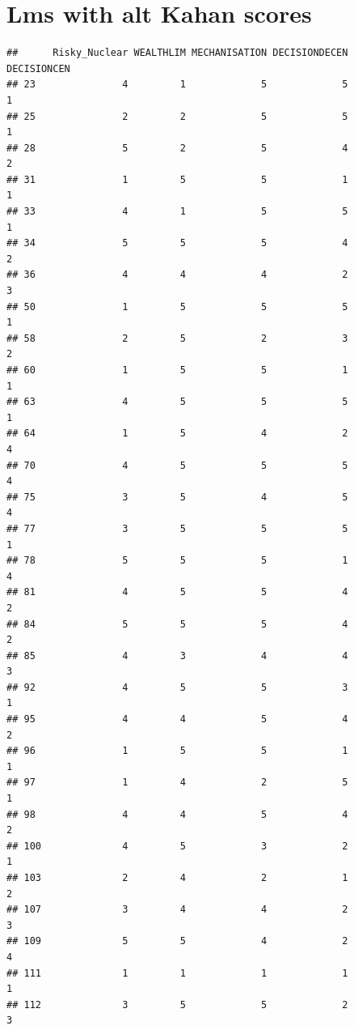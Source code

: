 \documentclass[
]{article}
\begin{document}
\hypertarget{lms-with-alt-kahan-scores}{%
\section{Lms with alt Kahan scores}\label{lms-with-alt-kahan-scores}}

\begin{verbatim}
##      Risky_Nuclear WEALTHLIM MECHANISATION DECISIONDECEN DECISIONCEN
## 23               4         1             5             5           1
## 25               2         2             5             5           1
## 28               5         2             5             4           2
## 31               1         5             5             1           1
## 33               4         1             5             5           1
## 34               5         5             5             4           2
## 36               4         4             4             2           3
## 50               1         5             5             5           1
## 58               2         5             2             3           2
## 60               1         5             5             1           1
## 63               4         5             5             5           1
## 64               1         5             4             2           4
## 70               4         5             5             5           4
## 75               3         5             4             5           4
## 77               3         5             5             5           1
## 78               5         5             5             1           4
## 81               4         5             5             4           2
## 84               5         5             5             4           2
## 85               4         3             4             4           3
## 92               4         5             5             3           1
## 95               4         4             5             4           2
## 96               1         5             5             1           1
## 97               1         4             2             5           1
## 98               4         4             5             4           2
## 100              4         5             3             2           1
## 103              2         4             2             1           2
## 107              3         4             4             2           3
## 109              5         5             4             2           4
## 111              1         1             1             1           1
## 112              3         5             5             2           3

\end{verbatim}
\end{document}
